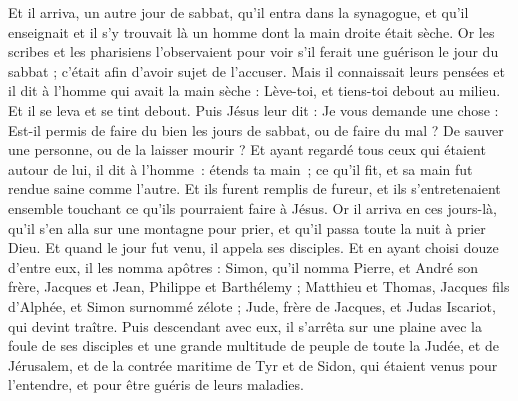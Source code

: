 \begin{multicols}{2}
Et il arriva, un autre jour de sabbat, qu'il entra dans la synagogue, et qu'il enseignait et il s'y trouvait là un homme dont la main droite était sèche.
Or les scribes et les pharisiens l'observaient pour voir s'il ferait une guérison le jour du sabbat ; c'était afin d'avoir sujet de l'accuser.
Mais il connaissait leurs pensées et il dit à l'homme qui avait la main sèche : Lève-toi, et tiens-toi debout au milieu. Et il se leva et se tint debout.
Puis Jésus leur dit : Je vous demande une chose : Est-il permis de faire du bien les jours de sabbat, ou de faire du mal ? De sauver une personne, ou de la laisser mourir ?
Et ayant regardé tous ceux qui étaient autour de lui, il dit à l’homme : étends ta main ; ce qu’il fit, et sa main fut rendue saine comme l’autre.
Et ils furent remplis de fureur, et ils s’entretenaient ensemble touchant ce qu’ils pourraient faire à Jésus.
Or il arriva en ces jours-là, qu’il s’en alla sur une montagne pour prier, et qu’il passa toute la nuit à prier Dieu.
Et quand le jour fut venu, il appela ses disciples. Et en ayant choisi douze d’entre eux, il les nomma apôtres :
Simon, qu'il nomma Pierre, et André son frère, Jacques et Jean, Philippe et Barthélemy ;
Matthieu et Thomas, Jacques fils d'Alphée, et Simon surnommé zélote ;
Jude, frère de Jacques, et Judas Iscariot, qui devint traître.
Puis descendant avec eux, il s'arrêta sur une plaine avec la foule de ses disciples et une grande multitude de peuple de toute la Judée, et de Jérusalem, et de la contrée maritime de Tyr et de Sidon, qui étaient venus pour l'entendre, et pour être guéris de leurs maladies.

\end{multicols}
